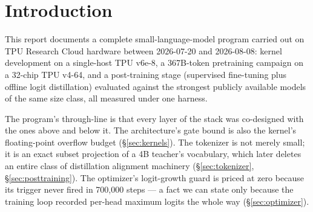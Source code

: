 \section{Introduction}

This report documents a complete small-language-model program carried out
on TPU Research Cloud hardware between 2026-07-20 and 2026-08-08: kernel
development on a single-host TPU v6e-8, a 367B-token pretraining campaign
on a 32-chip TPU v4-64, and a post-training stage (supervised fine-tuning
plus offline logit distillation) evaluated against the strongest publicly
available models of the same size class, all measured under one harness.

The program's through-line is that every layer of the stack was
co-designed with the ones above and below it. The architecture's gate
bound is also the kernel's floating-point overflow budget
(\S\ref{sec:kernels}). The tokenizer is not merely small; it is an exact
subset projection of a 4B teacher's vocabulary, which later deletes an
entire class of distillation alignment machinery
(\S\ref{sec:tokenizer}, \S\ref{sec:posttraining}). The optimizer's
logit-growth guard is priced at zero because its trigger never fired in
700{,}000 steps --- a fact we can state only because the training loop
recorded per-head maximum logits the whole way (\S\ref{sec:optimizer}).

